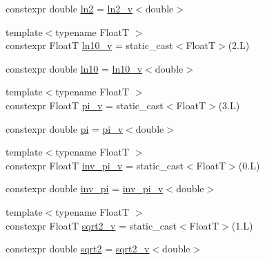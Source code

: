 \begin{DoxyCompactItemize}
\item 
constexpr double \hyperlink{namespacedevfix_1_1base_1_1numbers_a3cd216aaf5d432a90bb8ce09fd187dba}{ln2} = \hyperlink{namespacedevfix_1_1base_1_1numbers_a6fa1c65988b6d3574b4916b6423fc217}{ln2\+\_\+v}$<$double$>$
\item 
{\footnotesize template$<$typename FloatT $>$ }\\constexpr FloatT \hyperlink{namespacedevfix_1_1base_1_1numbers_a2dcf5bcbf25739e4964272d4f5c20f3f}{ln10\+\_\+v} = static\+\_\+cast$<$FloatT$>$(2.\+L)
\item 
constexpr double \hyperlink{namespacedevfix_1_1base_1_1numbers_aa9349b4fcaba4fc0f6da676265f99397}{ln10} = \hyperlink{namespacedevfix_1_1base_1_1numbers_a2dcf5bcbf25739e4964272d4f5c20f3f}{ln10\+\_\+v}$<$double$>$
\item 
{\footnotesize template$<$typename FloatT $>$ }\\constexpr FloatT \hyperlink{namespacedevfix_1_1base_1_1numbers_a5dc03b283872fcc39e2b3c4bacbaa40d}{pi\+\_\+v} = static\+\_\+cast$<$FloatT$>$(3.\+L)
\item 
constexpr double \hyperlink{namespacedevfix_1_1base_1_1numbers_a4d453d2292be52311d9a508a0d5817d1}{pi} = \hyperlink{namespacedevfix_1_1base_1_1numbers_a5dc03b283872fcc39e2b3c4bacbaa40d}{pi\+\_\+v}$<$double$>$
\item 
{\footnotesize template$<$typename FloatT $>$ }\\constexpr FloatT \hyperlink{namespacedevfix_1_1base_1_1numbers_a1b2a3987b0982788bc7f1088e468a13c}{inv\+\_\+pi\+\_\+v} = static\+\_\+cast$<$FloatT$>$(0.\+L)
\item 
constexpr double \hyperlink{namespacedevfix_1_1base_1_1numbers_a0c850245b7f9f2fb02a8101843a3e819}{inv\+\_\+pi} = \hyperlink{namespacedevfix_1_1base_1_1numbers_a1b2a3987b0982788bc7f1088e468a13c}{inv\+\_\+pi\+\_\+v}$<$double$>$
\item 
{\footnotesize template$<$typename FloatT $>$ }\\constexpr FloatT \hyperlink{namespacedevfix_1_1base_1_1numbers_a642fb0588fd64c0b82171acfdf734cb0}{sqrt2\+\_\+v} = static\+\_\+cast$<$FloatT$>$(1.\+L)
\item 
constexpr double \hyperlink{namespacedevfix_1_1base_1_1numbers_aa2240f758ac235d05735172517063a33}{sqrt2} = \hyperlink{namespacedevfix_1_1base_1_1numbers_a642fb0588fd64c0b82171acfdf734cb0}{sqrt2\+\_\+v}$<$double$>$
\end{DoxyCompactItemize}


